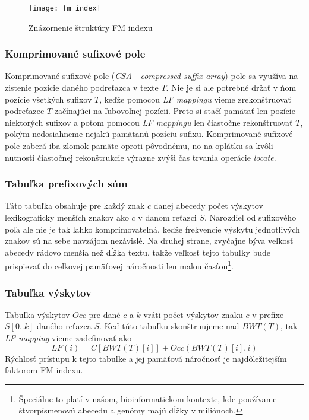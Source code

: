     \begin{figure}[h]
        \centering
        \texttt{[image: fm\_index]}
        \caption{Znázornenie štruktúry FM indexu}
        \label{fig:fm_index}
    \end{figure}
    
    \subsubsection{Komprimované sufixové pole}
    Komprimované sufixové pole (\emph{CSA - compressed suffix array}) pole sa využíva na zistenie pozície daného podreťazca v texte $T$. Nie je si ale potrebné držať v ňom pozície všetkých sufixov $T$, keďže pomocou \emph{LF mappingu} vieme zrekonštruovať podreťazec $T$ začínajúci na ľubovoľnej pozícii. Preto si stačí pamätať len pozície niektorých sufixov a potom pomocou \emph{LF mappingu} len čiastočne rekonštruovať $T$, pokým nedosiahneme nejakú pamätanú pozíciu sufixu. Komprimované sufixové pole zaberá iba zlomok pamäte oproti pôvodnému, no na oplátku sa kvôli nutnosti čiastočnej rekonštrukcie výrazne zvýši čas trvania operácie \emph{locate}.
    
    \subsubsection{Tabuľka prefixových súm}
    Táto tabuľka obsahuje pre každý znak $c$ danej abecedy počet výskytov lexikograficky menších znakov ako $c$ v danom reťazci $S$. Narozdiel od sufixového poľa ale nie je tak ľahko komprimovateľná, keďže frekvencie výskytu jednotlivých znakov sú na sebe navzájom nezávislé. Na druhej strane, zvyčajne býva veľkosť abecedy rádovo menšia než dĺžka textu, takže veľkosť tejto tabuľky bude prispievať do celkovej pamäťovej náročnosti len malou časťou\footnote{Špeciálne to platí v našom, bioinformatickom kontexte, kde používame štvorpísmenovú abecedu a genómy majú dĺžky v miliónoch.}.
    
    \subsubsection{Tabuľka výskytov}
    Tabuľka výskytov $Occ$ pre dané $c$ a $k$ vráti počet výskytov znaku $c$ v prefixe $S[0..k]$ daného reťazca $S$. Keď túto tabuľku skonštruujeme nad $BWT(T)$, tak \emph{LF mapping} vieme zadefinovať ako $$LF(i) = C[BWT(T)[i]] + Occ(BWT(T)[i], i)$$
    Rýchlosť prístupu k tejto tabuľke a jej pamäťová náročnosť je najdôležitejším faktorom FM indexu. 
    
